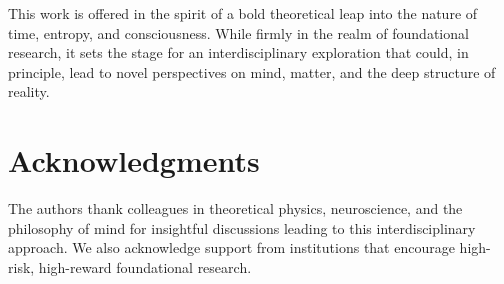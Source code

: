 \documentclass[12pt]{article}
\begin{document}
This work is offered in the spirit of a bold theoretical leap into the nature of time, entropy, and consciousness. While firmly in the realm of foundational research, it sets the stage for an interdisciplinary exploration that could, in principle, lead to novel perspectives on mind, matter, and the deep structure of reality.

\section*{Acknowledgments}
The authors thank colleagues in theoretical physics, neuroscience, and the philosophy of mind for insightful discussions leading to this interdisciplinary approach. We also acknowledge support from institutions that encourage high-risk, high-reward foundational research.
\end{document}
